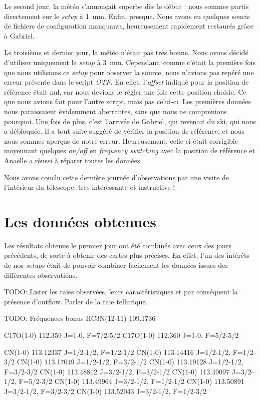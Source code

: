\documentclass[a4paper,10pt,french]{article}
\newcommand{\setup}{\textit{setup}}
\newcommand{\troismm}{\SI{3}{\milli\meter}}
\newcommand{\unmm}{\SI{1}{\milli\meter}}
\begin{document}
Le second jour, la météo s’annonçait superbe dès le début : nous sommes partis
directement sur le \setup{} à \unmm. Enfin, presque. Nous avons eu quelques
soucis de fichiers de configuration manquants, heureusement rapidement
restaurés grâce à Gabriel.

Le troisième et dernier jour, la météo n’était pas très bonne. Nous avons
décidé d’utiliser uniquement le \setup{} à \troismm. Cependant, comme c’était
la première fois que nous utilisions ce \setup{} pour observer la source, nous
n’avions pas repéré une erreur présente dans le script \textit{OTF}. En effet,
l’\textit{offset} indiqué pour la position de référence était nul, car nous
devions le régler une fois cette position choisie. Ce que nous avions fait pour
l’autre script, mais pas celui-ci. Les premières données nous paraissaient
évidemment aberrantes, sans que nous ne comprenions pourquoi. Une fois de plus,
c’est l’arrivée de Gabriel, qui revenait du ski, qui nous a débloquée. Il a
tout suite suggéré de vérifier la position de référence, et nous nous sommes
aperçus de notre erreur. Heureusement, celle-ci était corrigible moyennant
quelques \textit{on/off} en \textit{frequency switching} avec la position de
référence et Anaëlle a réussi à réparer toutes les données.

Nous avons conclu cette dernière journée d’observations par une visite de
l’intérieur du télescope, très intéressante et instructive !

\section{Les données obtenues}
\label{sec:resultats}

Les résultats obtenus le premier jour ont été combinés avec ceux des jours
précédents, de sorte à obtenir des cartes plus précises. En effet, l’un des
intérêts de nos \textit{setups} était de pouvoir combiner facilement les
données issues des différentes observations.

TODO: Lister les raies observées, leurs caractéristiques et par conséquent la
présence d’outflow. Parler de la raie tellurique.

TODO: Fréquences bonus
HC3N(12-11)         109.1736

C17O(1-0)           112.359    J=1-0,     F=7/2-5/2
C17O(1-0)           112.360    J=1-0,     F=5/2-5/2

CN(1-0)             113.12337  J=1/2-1/2, F=1/2-1/2
CN(1-0)             113.14416  J=1/2-1/2, F=1/2-3/2
CN(1-0)             113.17049  J=1/2-1/2, F=3/2-1/2
CN(1-0)             113.19128  J=1/2-1/2, F=3/2-3/2
CN(1-0)             113.48812  J=3/2-1/2, F=3/2-1/2
CN(1-0)             113.49097  J=3/2-1/2, F=5/2-3/2
CN(1-0)             113.49964  J=3/2-1/2, F=1/2-1/2
CN(1-0)             113.50891  J=3/2-1/2, F=3/2-3/2
CN(1-0)             113.52043  J=3/2-1/2, F=1/2-3/2
\end{document}
